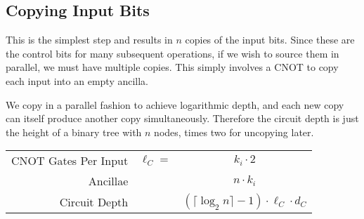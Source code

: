 \subsection{Copying Input Bits}
\label{subsec:copy}

This is the simplest step and results in $n$ copies of the input bits. Since
these are the control bits for many subsequent operations, if we wish to
source them in parallel, we must have multiple copies. This simply
involves a CNOT to copy each input into an empty ancilla.

We copy in a parallel fashion to achieve logarithmic depth, and each new
copy can itself produce another copy simultaneously. Therefore the circuit depth
is just the height of
a binary tree with $n$ nodes, times two for uncopying later.

\begin{table}
\begin{center}
\begin{tabular}{|r|cc|}
\hline
CNOT Gates Per Input &  $\ell_C = $ & $k_i \cdot 2$ \\
Ancillae & & $n\cdot k_i$\\
Circuit Depth & & $(\lceil \log_2 n \rceil - 1 )\cdot \ell_C \cdot d_C$\\
\hline
\end{tabular}
\end{center}
\end{table}
